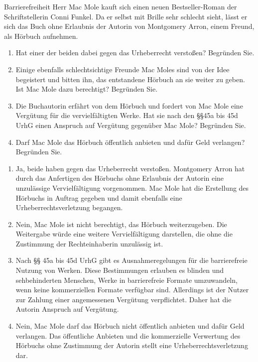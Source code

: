 \documentclass{article}
\begin{document}
\begin{exercise}{Barrierefreiheit}
  Herr Mac Mole kauft sich einen neuen Bestseller-Roman der Schriftstellerin Conni Funkel. Da er selbst mit Brille sehr schlecht sieht, lässt er sich das Buch ohne Erlaubnis der Autorin von Montgomery Arron, einem Freund, als Hörbuch aufnehmen.
  \begin{enumerate}
    \item Hat einer der beiden dabei gegen das Urheberrecht verstoßen? Begründen Sie.
    \item Einige ebenfalls schlechtsichtige Freunde Mac Moles sind von der Idee begeistert und bitten ihn, das entstandene Hörbuch an sie weiter zu geben. Ist Mac Mole dazu berechtigt? Begründen Sie.
    \item Die Buchautorin erfährt von dem Hörbuch und fordert von Mac Mole eine Vergütung für die vervielfältigten Werke. Hat sie nach den §§45a bis 45d UrhG einen Anspruch auf Vergütung gegenüber Mac Mole? Begründen Sie.
    \item Darf Mac Mole das Hörbuch öffentlich anbieten und dafür Geld verlangen? Begründen Sie.
  \end{enumerate}

  \begin{solution}
    \begin{enumerate}
      \item Ja, beide haben gegen das Urheberrecht verstoßen. Montgomery Arron hat durch das Anfertigen des Hörbuchs ohne Erlaubnis der Autorin eine unzulässige Vervielfältigung vorgenommen. Mac Mole hat die Erstellung des Hörbuchs in Auftrag gegeben und damit ebenfalls eine Urheberrechtsverletzung begangen.
      \item Nein, Mac Mole ist nicht berechtigt, das Hörbuch weiterzugeben. Die Weitergabe würde eine weitere Vervielfältigung darstellen, die ohne die Zustimmung der Rechteinhaberin unzulässig ist.
      \item Nach §§ 45a bis 45d UrhG gibt es Ausnahmeregelungen für die barrierefreie Nutzung von Werken. Diese Bestimmungen erlauben es blinden und sehbehinderten Menschen, Werke in barrierefreie Formate umzuwandeln, wenn keine kommerziellen Formate verfügbar sind. Allerdings ist der Nutzer zur Zahlung einer angemessenen Vergütung verpflichtet. Daher hat die Autorin Anspruch auf Vergütung.
      \item Nein, Mac Mole darf das Hörbuch nicht öffentlich anbieten und dafür Geld verlangen. Das öffentliche Anbieten und die kommerzielle Verwertung des Hörbuchs ohne Zustimmung der Autorin stellt eine Urheberrechtsverletzung dar.
    \end{enumerate}
  \end{solution}
\end{exercise}
\end{document}

